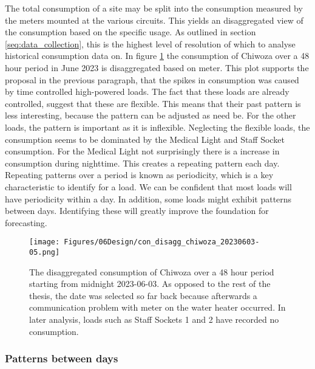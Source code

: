 The total consumption of a site may be split into the consumption measured by the meters mounted at the various circuits. This yields an disaggregated view of the consumption based on the specific usage. As outlined in section \ref{seq:data_collection}, this is the highest level of resolution of which to analyse historical consumption data on. In figure \ref{fig:con_disagg_chiwoza_20230603-05} the consumption of Chiwoza over a 48 hour period in June 2023 is disaggregated based on meter. This plot supports the proposal in the previous paragraph, that the spikes in consumption was caused by time controlled high-powered loads. The fact that these loads are already controlled, suggest that these are flexible. This means that their past pattern is less interesting, because the pattern can be adjusted as need be. For the other loads, the pattern is important as it is inflexible. Neglecting the flexible loads, the consumption seems to be dominated by the Medical Light and Staff Socket consumption. For the Medical Light not surprisingly there is a increase in consumption during nighttime. This creates a repeating pattern each day. Repeating patterns over a period is known as periodicity, which is a key characteristic to identify for a load. We can be confident that most loads will have periodicity within a day. In addition, some loads might exhibit patterns between days. Identifying these will greatly improve the foundation for forecasting.\\ 

\begin{figure}
    \centering
    \texttt{[image: Figures/06Design/con\_disagg\_chiwoza\_20230603-05.png]}
    \caption[Disaggregated Consumption Chiwoza 20230603-05]{The disaggregated consumption of Chiwoza over a 48 hour period starting from midnight 2023-06-03. As opposed to the rest of the thesis, the date was selected so far back because afterwards a communication problem with meter on the water heater occurred. In later analysis, loads such as Staff Sockets 1 and 2 have recorded no consumption. }
    \label{fig:con_disagg_chiwoza_20230603-05}
\end{figure}

\subsubsection{Patterns between days}\label{seq:periodicity}

